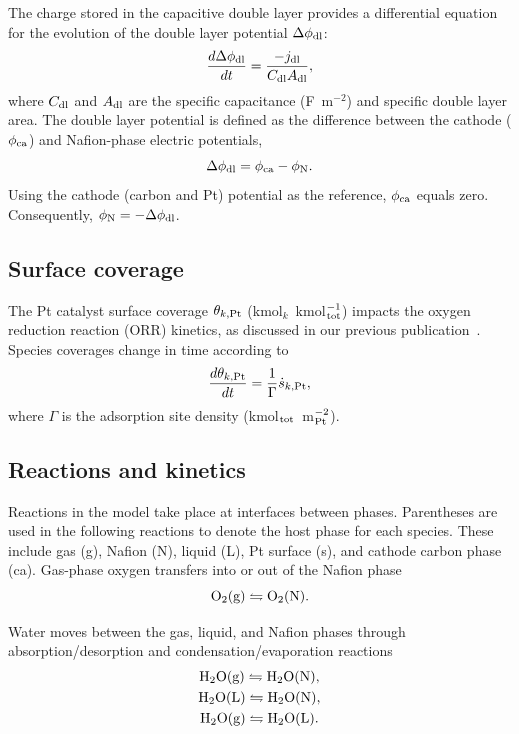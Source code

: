 \documentclass[final,3p,times,twocolumn]{elsarticle}    %
\begin{document}
The charge stored in the capacitive double layer provides a differential equation for the evolution of the double layer potential $\Delta\phi_{\rm dl}$:
\begin{equation}
    \frac{d \Delta\phi_{\rm dl}}{d t} = \frac{-j_{\rm dl}}{C_{\rm dl} A_{\rm dl}},
\end{equation}
where $C_{\rm dl}$ and $A_{\rm dl}$ are the specific capacitance (F~m$^{-2}$) and specific double layer area. The double layer potential is defined as the difference between the cathode ($\phi_{\rm ca}$) and Nafion-phase electric potentials,
\begin{equation}
    \Delta\phi_{\rm dl} = \phi_{\rm ca} - \phi_{\rm N}.
\end{equation}
Using the cathode (carbon and Pt) potential as the reference, $\phi_{\rm ca}$ equals zero. Consequently, $\phi_{\rm N}=-\Delta \phi_{\rm dl}$.

\subsection{Surface coverage}

The Pt catalyst surface coverage $\theta_{k, \rm Pt}$ (kmol$_k$~kmol$^{-1}_{\rm tot}$) impacts the oxygen reduction reaction (ORR) kinetics, as discussed in our previous publication~\cite{bib:randall_2020}. Species coverages change in time according to
\begin{equation}
    \frac{d \theta_{k, \rm Pt}}{d t} = \frac{1}{\Gamma} \dot{s}_{k, \rm Pt},
\end{equation}
where $\Gamma$ is the adsorption site density (kmol$_{\rm tot}$~m$^{-2}_{\rm Pt}$). 

\subsection{Reactions and kinetics}
\label{sect:kinetics}

Reactions in the model take place at interfaces between phases. Parentheses are used in the following reactions to denote the host phase for each species. These include gas (g), Nafion (N), liquid (L), Pt surface (s), and cathode carbon phase (ca). Gas-phase oxygen transfers into or out of the Nafion phase
\begin{equation} \label{eq:o2-gn}
    {\rm O_2(g) \leftrightharpoons O_2(N).}
\end{equation}

Water moves between the gas, liquid, and Nafion phases through absorption/desorption and condensation/evaporation reactions
\begin{gather}
    {\rm H_2O(g) \leftrightharpoons H_2O(N),} \label{eq:h2o-gn} \\
    {\rm H_2O(L) \leftrightharpoons H_2O(N),} \label{eq:h2o-wn} \\
    {\rm H_2O(g) \leftrightharpoons H_2O(L).} \label{eq:h2o-gw}
\end{gather}
\end{document}
